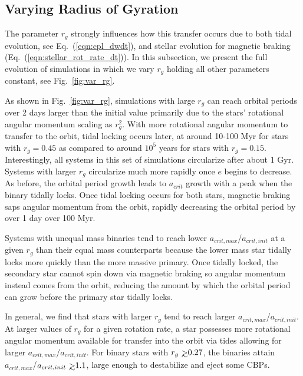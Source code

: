 \subsection{Varying Radius of Gyration} \label{sec:var_rg}

The parameter $r_g$ strongly influences how this transfer occurs due to both tidal evolution, see Eq.~(\ref{eqn:cpl_dwdt}), and stellar evolution for magnetic braking (Eq.~(\ref{eqn:stellar_rot_rate_dt})).  In this subsection, we present the full evolution of simulations in which we vary $r_g$ holding all other parameters constant, see Fig.~\ref{fig:var_rg}.

As shown in Fig.~\ref{fig:var_rg}, simulations with large $r_g$ can reach orbital periods over 2 days larger than the initial value primarily due to the stars' rotational angular momentum scaling as $r_g^2$.  With more rotational angular momentum to transfer to the orbit, tidal locking occurs later, at around 10-100 Myr for stars with $r_g=0.45$ as compared to around $10^5$ years for stars with $r_g=0.15$.  Interestingly, all systems in this set of simulations circularize after about 1 Gyr.  Systems with larger $r_g$ circularize much more rapidly once $e$ begins to decrease.  As before, the orbital period growth leads to $a_{crit}$ growth with a peak when the binary tidally locks.  Once tidal locking occurs for both stars, magnetic braking saps angular momentum from the orbit, rapidly decreasing the orbital period by over 1 day over 100 Myr.

Systems with unequal mass binaries tend to reach lower $a_{crit,max}$/$a_{crit,init}$ at a given $r_g$ than their equal mass counterparts because the lower mass star tidally locks more quickly than the more massive primary.  Once tidally locked, the secondary star cannot spin down via magnetic braking so angular momentum instead comes from the orbit, reducing the amount by which the orbital period can grow before the primary star tidally locks.

In general, we find that stars with larger $r_g$ tend to reach larger $a_{crit,max}$/$a_{crit,init}$.  At larger values of $r_g$ for a given rotation rate, a star possesses more rotational angular momentum available for transfer into the orbit via tides allowing for larger $a_{crit,max}$/$a_{crit,init}$.  For binary stars with $r_g \gsim 0.27$, the binaries attain $a_{crit,max}$/$a_{crit,init} \gsim 1.1$, large enough to destabilize and eject some CBPs.  

